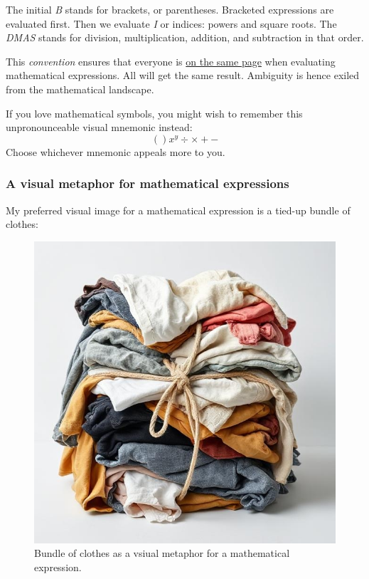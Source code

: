 \documentclass[
  a4paper,
]{article}
\begin{document}
The initial \emph{B} stands for brackets, or parentheses. Bracketed
expressions are evaluated first. Then we evaluate \emph{I} or indices:
powers and square roots. The \emph{DMAS} stands for division,
multiplication, addition, and subtraction in that order.

This \emph{convention} ensures that everyone is
\href{https://www.gingersoftware.com/content/phrases/on-the-same-page}{on
the same page} when evaluating mathematical expressions. All will get
the same result. Ambiguity is hence exiled from the mathematical
landscape.

If you love mathematical symbols, you might wish to remember this
unpronounceable visual mnemonic instead: \[
()x^y\div\times+-
\] Choose whichever mnemonic appeals more to you.

\subsubsection{A visual metaphor for mathematical
expressions}\label{a-visual-metaphor-for-mathematical-expressions}

My preferred visual image for a mathematical expression is a tied-up
bundle of clothes:

\begin{figure}
\centering
\includegraphics[width=0.8\linewidth,height=\textheight,keepaspectratio]{images/bundle-of-clothes-in-disarray.jpg}
\caption{Bundle of clothes as a vsiual metaphor for a mathematical
expression.}\label{fig:clothes-bundle}
\end{figure}
\end{document}
